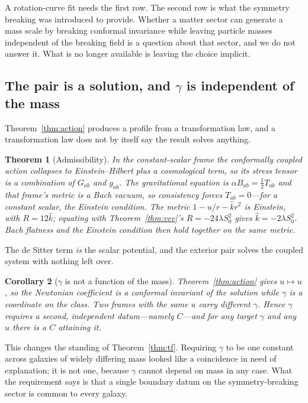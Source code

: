 \documentclass[11pt]{article}
\newtheorem{theorem}{Theorem}[section]
\newtheorem{corollary}[theorem]{Corollary}
\theoremstyle{definition}
\theoremstyle{remark}
\begin{document}
A rotation-curve fit needs the first row.  The second row is what the
symmetry breaking was introduced to provide.  Whether a matter sector can
generate a mass scale by breaking conformal invariance while leaving particle
masses independent of the breaking field is a question about that sector, and
we do not answer it.  What is no longer available is leaving the choice
implicit.

\subsection*{The pair is a solution, and \(\gamma\) is independent of the mass}

Theorem~\ref{thm:action} produces a profile from a transformation law, and a
transformation law does not by itself say the result solves anything.

\begin{theorem}[Admissibility]
\label{thm:admissible}
In the constant-scalar frame the conformally coupled action collapses to
Einstein--Hilbert plus a cosmological term, so its stress tensor is a
combination of \(G_{ab}\) and \(g_{ab}\).  The gravitational equation is
\(\alpha B_{ab}=\tfrac12 T_{ab}\) and that frame's metric is a Bach vacuum,
so consistency forces \(T_{ab}=0\)---for a constant scalar, the Einstein
condition.  The metric \(1-u/r-\hat kr^{2}\) is Einstein, with
\(R=12\hat k\); equating with Theorem~\ref{thm:vev}'s \(R=-24\lambda
S_{0}^{2}\) gives \(\hat k=-2\lambda S_{0}^{2}\).  Bach flatness and the
Einstein condition then hold together on the same metric.
\end{theorem}

The de Sitter term \emph{is} the scalar potential, and the exterior pair
solves the coupled system with nothing left over.

\begin{corollary}[\(\gamma\) is not a function of the mass]
\label{cor:notmass}
Theorem~\ref{thm:action} gives \(u\mapsto u\), so the Newtonian coefficient is
a conformal invariant of the solution while \(\gamma\) is a coordinate on the
class.  Two frames with the same \(u\) carry different \(\gamma\).  Hence
\(\gamma\) requires a second, independent datum---namely \(C\)---and for any
target \(\gamma\) and any \(u\) there is a \(C\) attaining it.
\end{corollary}

This changes the standing of Theorem~\ref{thm:tf}.  Requiring \(\gamma\) to be
one constant across galaxies of widely differing mass looked like a
coincidence in need of explanation; it is not one, because \(\gamma\) cannot
depend on mass in any case.  What the requirement says is that a single
boundary datum on the symmetry-breaking sector is common to every galaxy.
\end{document}
